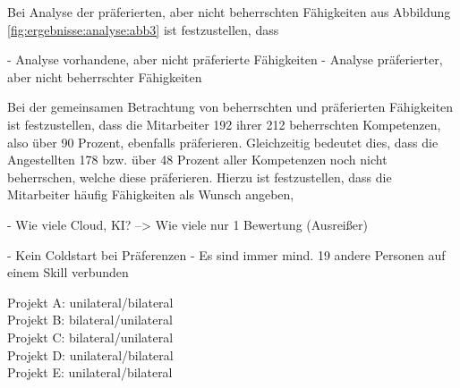 Bei Analyse der präferierten, aber nicht beherrschten Fähigkeiten aus Abbildung \ref{fig:ergebnisse:analyse:abb3} ist festzustellen, dass


\newpage

- Analyse vorhandene, aber nicht präferierte Fähigkeiten
- Analyse präferierter, aber nicht beherrschter Fähigkeiten

Bei der gemeinsamen Betrachtung von beherrschten und präferierten Fähigkeiten ist festzustellen, dass die Mitarbeiter 192 ihrer 212 beherrschten Kompetenzen, also über 90 Prozent, ebenfalls präferieren. Gleichzeitig bedeutet dies, dass die Angestellten 178 bzw. über 48 Prozent aller Kompetenzen noch nicht beherrschen, welche diese präferieren. Hierzu ist festzustellen, dass die Mitarbeiter häufig Fähigkeiten als Wunsch angeben, 

- Wie viele Cloud, KI? --> Wie viele nur 1 Bewertung (Ausreißer)


- Kein Coldstart bei Präferenzen
- Es sind immer mind. 19 andere Personen auf einem Skill verbunden

Projekt A: unilateral/bilateral\\
Projekt B: bilateral/unilateral\\
Projekt C: bilateral/unilateral\\
Projekt D: unilateral/bilateral\\
Projekt E: unilateral/bilateral


